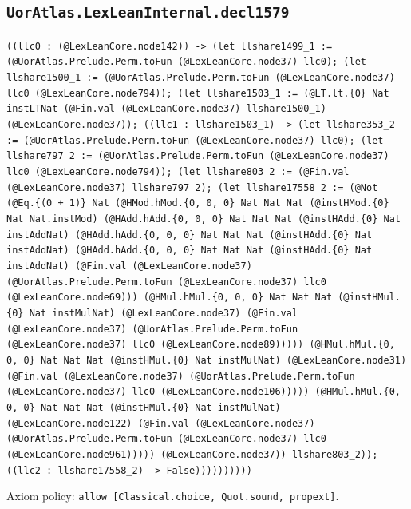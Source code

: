 \documentclass[11pt]{article}
\begin{document}
\subsection*{\texttt{UorAtlas.LexLeanInternal.decl1579}}
\noindent\texttt{((llc0 : (@LexLeanCore.node142)) -> (let llshare1499\_1 := (@UorAtlas.Prelude.Perm.toFun (@LexLeanCore.node37) llc0); (let llshare1500\_1 := (@UorAtlas.Prelude.Perm.toFun (@LexLeanCore.node37) llc0 (@LexLeanCore.node794)); (let llshare1503\_1 := (@LT.lt.\{0\} Nat instLTNat (@Fin.val (@LexLeanCore.node37) llshare1500\_1) (@LexLeanCore.node37)); ((llc1 : llshare1503\_1) -> (let llshare353\_2 := (@UorAtlas.Prelude.Perm.toFun (@LexLeanCore.node37) llc0); (let llshare797\_2 := (@UorAtlas.Prelude.Perm.toFun (@LexLeanCore.node37) llc0 (@LexLeanCore.node794)); (let llshare803\_2 := (@Fin.val (@LexLeanCore.node37) llshare797\_2); (let llshare17558\_2 := (@Not (@Eq.\{(0 + 1)\} Nat (@HMod.hMod.\{0, 0, 0\} Nat Nat Nat (@instHMod.\{0\} Nat Nat.instMod) (@HAdd.hAdd.\{0, 0, 0\} Nat Nat Nat (@instHAdd.\{0\} Nat instAddNat) (@HAdd.hAdd.\{0, 0, 0\} Nat Nat Nat (@instHAdd.\{0\} Nat instAddNat) (@HAdd.hAdd.\{0, 0, 0\} Nat Nat Nat (@instHAdd.\{0\} Nat instAddNat) (@Fin.val (@LexLeanCore.node37) (@UorAtlas.Prelude.Perm.toFun (@LexLeanCore.node37) llc0 (@LexLeanCore.node69))) (@HMul.hMul.\{0, 0, 0\} Nat Nat Nat (@instHMul.\{0\} Nat instMulNat) (@LexLeanCore.node37) (@Fin.val (@LexLeanCore.node37) (@UorAtlas.Prelude.Perm.toFun (@LexLeanCore.node37) llc0 (@LexLeanCore.node89))))) (@HMul.hMul.\{0, 0, 0\} Nat Nat Nat (@instHMul.\{0\} Nat instMulNat) (@LexLeanCore.node31) (@Fin.val (@LexLeanCore.node37) (@UorAtlas.Prelude.Perm.toFun (@LexLeanCore.node37) llc0 (@LexLeanCore.node106))))) (@HMul.hMul.\{0, 0, 0\} Nat Nat Nat (@instHMul.\{0\} Nat instMulNat) (@LexLeanCore.node122) (@Fin.val (@LexLeanCore.node37) (@UorAtlas.Prelude.Perm.toFun (@LexLeanCore.node37) llc0 (@LexLeanCore.node961))))) (@LexLeanCore.node37)) llshare803\_2)); ((llc2 : llshare17558\_2) -> False))))))))))}\par
\noindent Axiom policy: \texttt{allow [Classical.choice, Quot.sound, propext]}.\par
\end{document}
